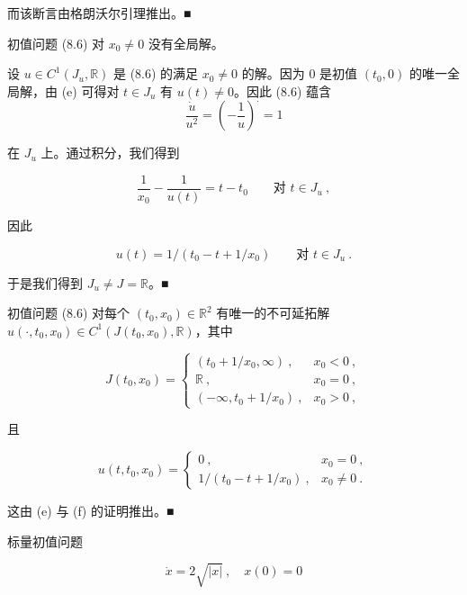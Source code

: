 \begin{remark}
\begin{items}
而该断言由格朗沃尔引理推出。\nobreak\hspace{0.35em}■

\item

初值问题 (8.6) 对 $ x_{0}\ne 0 $ 没有全局解。

\proofhead
设 $ u\in C^{1}(J_{u},\mathbb{R}) $ 是 (8.6) 的满足 $ x_{0}\ne 0 $ 的解。因为 0 是初值 $ (t_{0},0) $ 的唯一全局解，由 (e) 可得对 $ t\in J_{u} $ 有 $ u(t)\ne 0 $。因此 (8.6) 蕴含
\[
\frac{\dot{u}}{u^{2}}=\left(-\frac{1}{u}\right)^{\cdot}=1
\]

在 $ J_{u} $ 上。通过积分，我们得到

\[
\frac{1}{x_{0}}-\frac{1}{u(t)}=t-t_{0}\qquad\text{对 }t\in J_{u}\ ,
\]

因此

\[
u(t)=1/(t_{0}-t+1/x_{0})\qquad\text{对 }t\in J_{u} \ .
\]

于是我们得到 $ J_{u}\ne J=\mathbb{R} $。\nobreak\hspace{0.35em}■

\item

初值问题 (8.6) 对每个 $ (t_{0},x_{0})\in\mathbb{R}^{2} $ 有唯一的不可延拓解 $ u(\cdot,t_{0},x_{0})\in C^{1}(J(t_{0},x_{0}),\mathbb{R}) $，其中

\begin{equation*}
J(t_{0},x_{0})=\begin{cases}(t_{0}+1/x_{0},\infty)\ , & x_{0}<0\ ,\\ \mathbb{R}\ , & x_{0}=0\ ,\\ (-\infty,t_{0}+1/x_{0})\ , & x_{0}>0\ ,\end{cases}
\end{equation*}

且

\begin{equation*}
u(t,t_{0},x_{0})=\begin{cases}0\ , & x_{0}=0\ ,\\ 1/(t_{0}-t+1/x_{0})\ , & x_{0}\ne 0\ .\end{cases}
\end{equation*}

\proofhead
这由 (e) 与 (f) 的证明推出。\nobreak\hspace{0.35em}■
\item

标量初值问题

\begin{equation}
\dot{x}=2\sqrt{|x|}\ ,\quad x(0)=0\tag{8.7}
\end{equation}


\end{items}
\end{remark}
